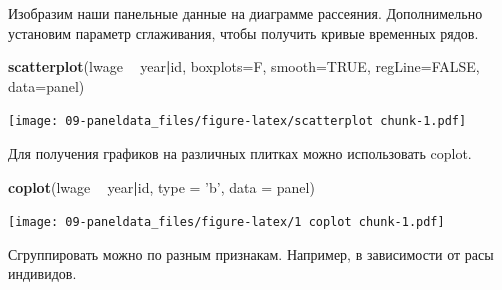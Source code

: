\documentclass[]{book}
\newenvironment{Shaded}{\begin{snugshade}}{\end{snugshade}}
\newcommand{\ControlFlowTok}[1]{\textcolor[rgb]{0.13,0.29,0.53}{\textbf{#1}}}
\newcommand{\DataTypeTok}[1]{\textcolor[rgb]{0.13,0.29,0.53}{#1}}
\newcommand{\DecValTok}[1]{\textcolor[rgb]{0.00,0.00,0.81}{#1}}
\newcommand{\FloatTok}[1]{\textcolor[rgb]{0.00,0.00,0.81}{#1}}
\newcommand{\KeywordTok}[1]{\textcolor[rgb]{0.13,0.29,0.53}{\textbf{#1}}}
\newcommand{\NormalTok}[1]{#1}
\newcommand{\OperatorTok}[1]{\textcolor[rgb]{0.81,0.36,0.00}{\textbf{#1}}}
\newcommand{\OtherTok}[1]{\textcolor[rgb]{0.56,0.35,0.01}{#1}}
\newcommand{\StringTok}[1]{\textcolor[rgb]{0.31,0.60,0.02}{#1}}
\begin{document}
Изобразим наши панельные данные на диаграмме рассеяния. Дополнимельно установим параметр сглаживания, чтобы получить кривые временных рядов.

\begin{Shaded}
\begin{Highlighting}[]
\KeywordTok{scatterplot}\NormalTok{(lwage }\OperatorTok{~}\StringTok{ }\NormalTok{year}\OperatorTok{|}\NormalTok{id, }\DataTypeTok{boxplots=}\NormalTok{F, }\DataTypeTok{smooth=}\OtherTok{TRUE}\NormalTok{, }\DataTypeTok{regLine=}\OtherTok{FALSE}\NormalTok{, }\DataTypeTok{data=}\NormalTok{panel)}
\end{Highlighting}
\end{Shaded}

\texttt{[image: 09-paneldata\_files/figure-latex/scatterplot chunk-1.pdf]}

Для получения графиков на различных плитках можно использовать coplot.

\begin{Shaded}
\begin{Highlighting}[]
\KeywordTok{coplot}\NormalTok{(lwage }\OperatorTok{~}\StringTok{ }\NormalTok{year}\OperatorTok{|}\NormalTok{id, }\DataTypeTok{type =} \StringTok{'b'}\NormalTok{, }\DataTypeTok{data =}\NormalTok{ panel)}
\end{Highlighting}
\end{Shaded}

\texttt{[image: 09-paneldata\_files/figure-latex/1 coplot chunk-1.pdf]}

Сгруппировать можно по разным признакам. Например, в зависимости от расы индивидов.

\begin{Shaded}
\end{Shaded}
\end{document}
